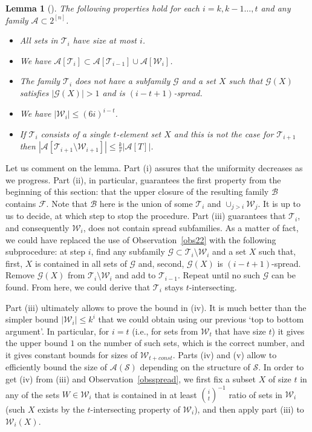 \documentclass[graybox]{svmult}
\renewcommand{\le}{\leqslant}
\newcommand{\ff}{\mathcal{F}}
\newcommand{\aaa}{\mathcal{A}}
\newcommand{\m}{\mathcal}
\newcommand{\T}{\mathcal{T}}
\newcommand{\W}{\mathcal{W}}
\newtheorem{lem}[thm]{Lemma}
\begin{document}
\begin{lem}[\cite{Kup54}]\label{lemkeyred} The following properties hold for each $i = k,k-1\ldots, t$ and any family $\aaa\subset 2^{[n]}$. %
\begin{itemize}
  \item[(i)] All sets  in $\T_i$ have size at most $i$.
  \item[(ii)] We have $\aaa[\T_{i}]\subset \aaa[\T_{i-1}]\cup \aaa[\W_{i}]$.
  \item[(iii)] The family $\T_i$ does not have a subfamily $\mathcal G$ and a set $X$ such that $\mathcal G(X)$ satisfies $|\mathcal G(X)|>1$ and is $(i-t+1)$-spread.
  \item[(iv)] We have $|\W_i|\le (6i)^{i-t}$.
  \item[(v)] If $\T_i$ consists of a single $t$-element set $X$ and this is not the case for $\T_{i+1}$ then $|\aaa[\T_{i+1}\setminus \W_{i+1}]|\le \frac{k}r |\aaa[T]|$.
\end{itemize}
\end{lem}

Let us comment on the lemma. Part (i) assures that the uniformity decreases as we progress. Part (ii), in particular, guarantees the first property from the beginning of this section: that the upper closure of the resulting family $\mathcal B$ contains $\ff$. Note that $\mathcal B$ here is the union of some $\m T_i$ and $\cup_{j>i}\m W_j$. It is up to us to decide, at which step to stop the procedure. Part (iii) guarantees that $\m T_i$, and consequently $\m W_i$, does not contain spread subfamilies. As a matter of fact, we could have replaced the use of Observation~\ref{obs22} with the following subprocedure: at step $i$, find any subfamily $\m G\subset \m T_i\setminus \m W_i$ and a set $X$ such that, first, $X$ is contained in all sets of $\m G$ and, second, $\m G(X)$ is $(i-t+1)$-spread. Remove $\m G(X)$ from $\m T_i\setminus \m W_i$ and add to $\m T_{i-1}$. Repeat until no such $\m G$ can be found.  From here, we could derive that $\m T_i$ stays $t$-intersecting.

Part (iii) ultimately allows to prove the bound in (iv). It is much better than the simpler bound  $|\W_i|\le k^{i}$ that we could obtain using our previous `top to bottom argument'. In particular, for $i = t$ (i.e., for sets from $\W_{t}$ that have size $t$) it gives the upper bound $1$ on the number of such sets, which is the correct number, and it gives constant bounds for sizes of $\W_{t+const}$. Parts (iv) and (v) allow to efficiently bound the size of $\aaa(\mathcal S)$ depending on the structure of $\mathcal S$. In order to get (iv) from (iii) and Observation~\ref{obsspread}, we first fix a subset $X$ of size $t$ in any of the sets $W\in \m W_i$ that is contained in at least ${i\choose t}^{-1}$ ratio of sets in $\m W_i$ (such $X$ exists by the $t$-intersecting property of $\m W_i$), and then apply part (iii) to $\m W_i(X)$.
\end{document}
